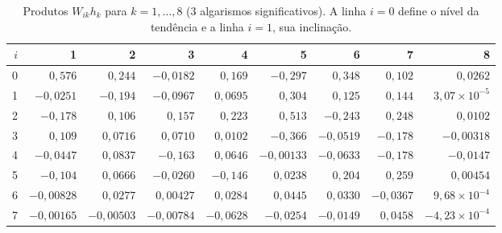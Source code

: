 \documentclass[11pt,a4paper]{article}
\begin{document}
\begin{table}[H]
\centering
\caption{Produtos $W_{ik}h_k$ para $k=1,\dots,8$ (3 algarismos significativos). A linha $i=0$ define o nível da tendência e a linha $i=1$, sua inclinação.}\label{tab:prod0}
\footnotesize
\begin{tabular}{rrrrrrrrr}
\toprule
$i$ & 1 & 2 & 3 & 4 & 5 & 6 & 7 & 8 \\
\midrule
0 & $0,576$ & $0,244$ & $-0,0182$ & $0,169$ & $-0,297$ & $0,348$ & $0,102$ & $0,0262$ \\
1 & $-0,0251$ & $-0,194$ & $-0,0967$ & $0,0695$ & $0,304$ & $0,125$ & $0,144$ & $3,07\times 10^{-5}$ \\
2 & $-0,178$ & $0,106$ & $0,157$ & $0,223$ & $0,513$ & $-0,243$ & $0,248$ & $0,0102$ \\
3 & $0,109$ & $0,0716$ & $0,0710$ & $0,0102$ & $-0,366$ & $-0,0519$ & $-0,178$ & $-0,00318$ \\
4 & $-0,0447$ & $0,0837$ & $-0,163$ & $0,0646$ & $-0,00133$ & $-0,0633$ & $-0,178$ & $-0,0147$ \\
5 & $-0,104$ & $0,0666$ & $-0,0260$ & $-0,146$ & $0,0238$ & $0,204$ & $0,259$ & $0,00454$ \\
6 & $-0,00828$ & $0,0277$ & $0,00427$ & $0,0284$ & $0,0445$ & $0,0330$ & $-0,0367$ & $9,68\times 10^{-4}$ \\
7 & $-0,00165$ & $-0,00503$ & $-0,00784$ & $-0,0628$ & $-0,0254$ & $-0,0149$ & $0,0458$ & $-4,23\times 10^{-4}$ \\
\bottomrule
\end{tabular}
\par\vspace{2pt}{\footnotesize Fonte: elaborado pelo autor.}
\end{table}
\end{document}
